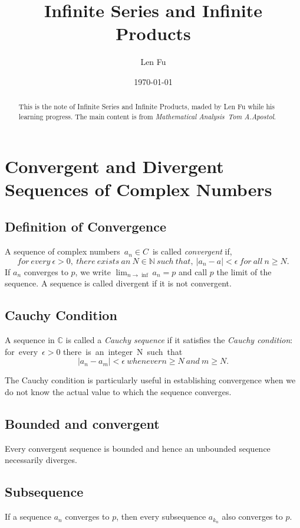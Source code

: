 \documentclass[12pt]{article}
\title{Infinite Series and Infinite Products}
\author{Len Fu}
\date{\today}
\begin{document}
\maketitle

\begin{abstract}
This is the note of Infinite Series and Infinite Products,
 maded by Len Fu while his learning progress.
 The main content is from \textit{Mathematical Analysis\ Tom A.Apostol}.
\end{abstract}
\newpage

\renewcommand{\contentsname}{Contents}
\tableofcontents
\newpage

\section{Convergent and Divergent Sequences of Complex Numbers}
\subsection{Definition of Convergence}
A sequence of complex numbers\ $a_{n}\in C$\ is called \textit{convergent} if,
$$for\ every\ \epsilon>0,\ there\ exists\ an\ N\in\mathbb{N}\ such\ that,\
|a_{n}-a|<\epsilon\ for\ all\ n\geq N.$$
If ${a_{n}}$ converges to $p$, we write $\lim_{n\rightarrow\inf}a_{n}=p$ and call
$p$ the limit of the sequence. A sequence is called divergent if it is not convergent.

\subsection{Cauchy Condition}
A sequence in $\mathbb{C}$ is called a \textit{Cauchy sequence} if it satisfies the 
\textit{Cauchy condition}:
for\ every\ $\epsilon>0$ there\ is\ an\ integer\ N\ such\ that\
$$|a_{n}-a_{m}|<\epsilon\ whenever n\geq N\ and\ m\geq N.$$

The Cauchy condition is particularly useful in establishing 
convergence when we do not know the actual value to which 
the sequence converges.

\subsection{Bounded and convergent}
Every convergent sequence is bounded and hence an unbounded sequence 
necessarily diverges.

\subsection{Subsequence}
If a sequence ${a_{n}}$ converges to $p$, then every subsequence ${a_{k_{n}}}$ 
also converges to $p$.
\end{document}
